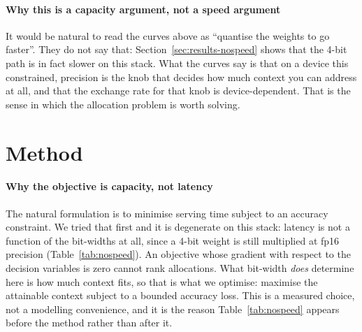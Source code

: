 \documentclass[5p]{elsarticle}
\begin{document}
\paragraph*{Why this is a capacity argument, not a speed argument}
It would be natural to read the curves above as ``quantise the weights to go
faster''. They do not say that: Section~\ref{sec:results-nospeed} shows that the
4-bit path is in fact slower on this stack. What the curves say is that on a
device this constrained, precision is the knob that decides how much context you
can address at all, and that the exchange rate for that knob is device-dependent.
That is the sense in which the allocation problem is worth solving.

\section{Method}
\label{sec:method}

\paragraph*{Why the objective is capacity, not latency}
The natural formulation is to minimise serving time subject to an accuracy
constraint. We tried that first and it is degenerate on this stack: latency is
not a function of the bit-widths at all, since a 4-bit weight is still multiplied
at fp16 precision (Table~\ref{tab:nospeed}). An objective whose gradient with
respect to the decision variables is zero cannot rank allocations. What bit-width
\emph{does} determine here is how much context fits, so that is what we optimise:
maximise the attainable context subject to a bounded accuracy loss. This is a
measured choice, not a modelling convenience, and it is the reason
Table~\ref{tab:nospeed} appears before the method rather than after it.
\end{document}

